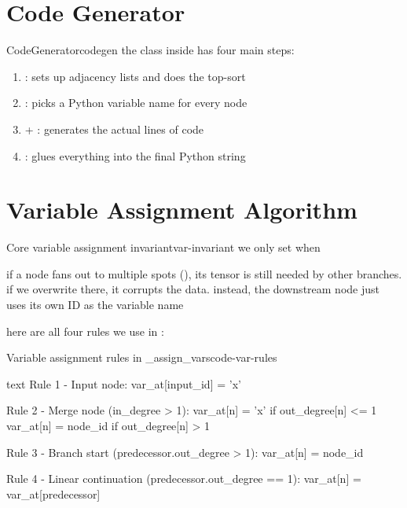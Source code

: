 \documentclass{nngraph-en}
\begin{document}
\section{Code Generator}

\begin{dfnbox}{CodeGenerator}{codegen}
the  class inside  has four main steps:
\begin{enumerate}[noitemsep]
    \item {}: sets up adjacency lists and does the top-sort
    \item {}: picks a Python variable name for every node
    \item {} + : generates the actual lines of code
    \item {}: glues everything into the final Python string
\end{enumerate}
\end{dfnbox}

\section{Variable Assignment Algorithm}

\begin{dfnbox}{Core variable assignment invariant}{var-invariant}
we only set  when 

if a node fans out to multiple spots (), its tensor is still needed by other branches. if we overwrite  there, it corrupts the data. instead, the downstream node just uses its own ID as the variable name
\end{dfnbox}

here are all four rules we use in :

\begin{codebox}{Variable assignment rules in \_assign\_vars}{code-var-rules}
\begin{amzcode}{text}
Rule 1 - Input node:
    var_at[input_id] = 'x'

Rule 2 - Merge node (in_degree > 1):
    var_at[n] = 'x'       if out_degree[n] <= 1
    var_at[n] = node_id   if out_degree[n] > 1

Rule 3 - Branch start (predecessor.out_degree > 1):
    var_at[n] = node_id

Rule 4 - Linear continuation (predecessor.out_degree == 1):
    var_at[n] = var_at[predecessor]
\end{amzcode}
\end{codebox}
\end{document}
